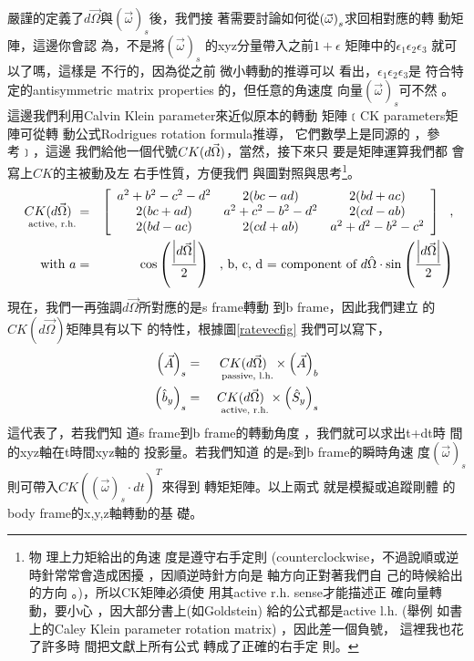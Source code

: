 \documentclass[12pt,twoside]{article}
\begin{document}
嚴謹的定義了$d\vec{\Omega}$與$%
\left( \vec{\omega}\right) _{s}$後，我們接%
著需要討論如何從$\left( \vec{%
\omega}\right) _{s}$求回相對應的轉%
動矩陣，這邊你會認%
為，不是將$\left( \vec{\omega}\right) _{s}$%
的xyz分量帶入之前$1+\epsilon $%
矩陣中的$\epsilon _{1}\epsilon _{2}\epsilon _{3}$%
就可以了嗎，這樣是%
不行的，因為從之前%
微小轉動的推導可以%
看出，$\epsilon _{1}\epsilon _{2}\epsilon _{3}$是%
符合特定的antisymmetric matrix properties%
的，但任意的角速度%
向量$\left( \vec{\omega}\right) _{s}$可不然%
。這邊我們利用Calvin Klein
parameter來近似原本的轉動%
矩陣﹝CK parameters矩陣可從轉%
動公式Rodrigues rotation formula推導，%
它們數學上是同源的%
，參考\cite{goldstein}﹞，這邊%
我們給他一個代號$CK(d\vec{%
\Omega})$，當然，接下來只%
要是矩陣運算我們都%
會寫上$CK$的主被動及左%
右手性質，方便我們%
與圖對照與思考\footnote{物%
理上力矩給出的角速%
度是遵守右手定則%
(counterclockwise，不過說順或逆%
時針常常會造成困擾%
，因順逆時針方向是%
軸方向正對著我們自%
己的時候給出的方向%
。)，所以CK矩陣必須使%
用其active r.h. sense才能描述正%
確向量轉動，要小心%
，因大部分書上(如Goldstein)%
給的公式都是active l.h. (舉例%
如書上的Caley Klein parameter rotation matrix)%
，因此差一個負號，%
這裡我也花了許多時%
間把文獻上所有公式%
轉成了正確的右手定%
則。}。%
\begin{eqnarray*}
\underset{\text{active, r.h.}}{CK(d\vec{\Omega})} &=&\left[ 
\begin{array}{ccc}
a^{2}+b^{2}-c^{2}-d^{2} & 2(bc-ad) & 2(bd+ac) \\ 
2(bc+ad) & a^{2}+c^{2}-b^{2}-d^{2} & 2(cd-ab) \\ 
2(bd-ac) & 2(cd+ab) & a^{2}+d^{2}-b^{2}-c^{2}%
\end{array}%
\right] \text{,} \\
\text{with }a &=&\cos \left( \frac{\left\vert d\vec{\Omega}\right\vert }{2}%
\right) \text{, b, c, d = component of }d\hat{\Omega}\cdot \sin \left( \frac{%
\left\vert d\vec{\Omega}\right\vert }{2}\right)
\end{eqnarray*}%
現在，我們一再強調$d%
\vec{\Omega}$所對應的是s frame轉動%
到b frame，因此我們建立%
的$CK(d\vec{\Omega})$矩陣具有以下%
的特性，根據圖\ref{ratevecfig}%
我們可以寫下，%
\begin{eqnarray}
\left( \vec{A}\right) _{s} &=&\underset{\text{passive, l.h.}}{CK(d\vec{\Omega%
})}\times \left( \vec{A}\right) _{b}  \label{frametrans} \\
\left( \hat{b}_{y}\right) _{s} &=&\underset{\text{active, r.h.}}{CK(d\vec{%
\Omega})}\times \left( \hat{S}_{y}\right) _{s}  \label{vecrot}
\end{eqnarray}%
這代表了，若我們知%
道s frame到b frame的轉動角度%
，我們就可以求出t+dt時%
間的xyz軸在t時間xyz軸的%
投影量。若我們知道%
的是s到b frame的瞬時角速%
度$\left( \vec{\omega}\right) _{s}$則可帶入$%
CK(\left( \vec{\omega}\right) _{s}\cdot dt)^{T}$來得到%
轉矩矩陣。以上兩式%
就是模擬或追蹤剛體%
的body frame的x,y,z軸轉動的基%
礎。
\end{document}
